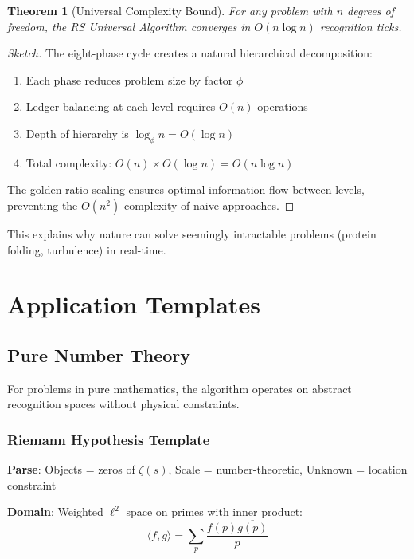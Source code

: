 \documentclass[12pt,a4paper]{article}
\newtheorem{theorem}{Theorem}
\begin{document}
\begin{theorem}[Universal Complexity Bound]
For any problem with $n$ degrees of freedom, the RS Universal Algorithm converges in $O(n \log n)$ recognition ticks.
\end{theorem}

\begin{proof}[Sketch]
The eight-phase cycle creates a natural hierarchical decomposition:
\begin{enumerate}
\item Each phase reduces problem size by factor $\phi$
\item Ledger balancing at each level requires $O(n)$ operations
\item Depth of hierarchy is $\log_\phi n = O(\log n)$
\item Total complexity: $O(n) \times O(\log n) = O(n \log n)$
\end{enumerate}

The golden ratio scaling ensures optimal information flow between levels, preventing the $O(n^2)$ complexity of naive approaches.
\end{proof}

This explains why nature can solve seemingly intractable problems (protein folding, turbulence) in real-time.

\section{Application Templates}

\subsection{Pure Number Theory}

For problems in pure mathematics, the algorithm operates on abstract recognition spaces without physical constraints.

\subsubsection{Riemann Hypothesis Template}

\textbf{Parse}: Objects = zeros of $\zeta(s)$, Scale = number-theoretic, Unknown = location constraint

\textbf{Domain}: Weighted $\ell^2$ space on primes with inner product:
\begin{equation}
\langle f, g \rangle = \sum_p \frac{f(p) \overline{g(p)}}{p}
\end{equation}
\end{document}
